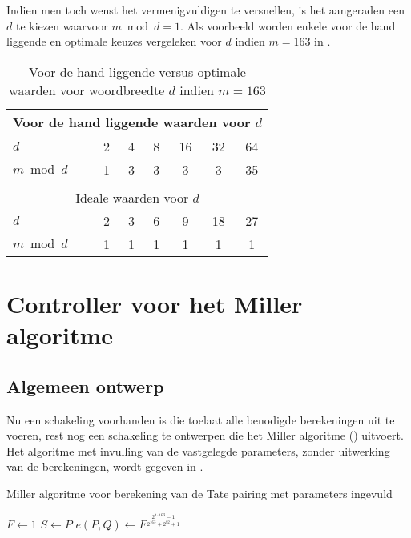 Indien men toch wenst het vermenigvuldigen te versnellen, is het aangeraden een $d$ te kiezen waarvoor $m \bmod d = 1$. Als voorbeeld worden enkele voor de hand liggende en optimale keuzes vergeleken voor $d$ indien $m = 163$ in .

\begin{table}[h]
	\caption{Voor de hand liggende versus optimale waarden voor woordbreedte $d$ indien \mbox{$m=163$}}
	\label{tabel-implementatie-woordbreedte-d}
	\begin{tabular}{|l|c|c|c|c|c|c|}
		\hline
		\multicolumn{7}{|c|}{Voor de hand liggende waarden voor $d$}\\
		\hline
		$d$			& 2	& 4	& 8	& 16	& 32	& 64\\
		$m \bmod d$	& 1	& 3	& 3	& 3	& 3	& 35\\
		\hline
		\multicolumn{7}{c}{}\\
		\hline
		\multicolumn{7}{|c|}{Ideale waarden voor $d$}\\
		\hline
		$d$			& 2	& 3	& 6	& 9	& 18	& 27\\
		$m \bmod d$	& 1	& 1	& 1	& 1	& 1	& 1\\
		\hline
	\end{tabular}
\end{table}

\section{Controller voor het Miller algoritme\label{sectie-implementatie-miller}}

\subsection{Algemeen ontwerp\label{subsectie-implementatie-miller-ontwerp}}

Nu een schakeling voorhanden is die toelaat alle benodigde berekeningen uit te voeren, rest nog een schakeling te ontwerpen die het Miller algoritme () uitvoert. Het algoritme met invulling van de vastgelegde parameters, zonder uitwerking van de berekeningen, wordt gegeven in .

\begin{algorithm}[h]
	\caption{Miller algoritme voor berekening van de Tate pairing met parameters ingevuld}
	\label{algoritme-implementatie-miller-algemeen}
	$F \leftarrow 1$\;
	$S \leftarrow P$\;
	$e(P, Q) \leftarrow F^{\frac{2^{4 \cdot 163} - 1}{2^{163} + 2^{82} + 1}}$\;
\end{algorithm}

